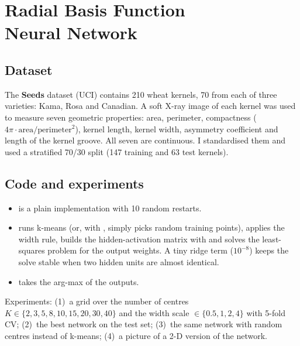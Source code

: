 \chapter[Radial Basis Function Neural Network]{Radial Basis Function\\Neural Network}


\section{Dataset}
The \textbf{Seeds} dataset (UCI) contains 210 wheat kernels, 70 from each of three varieties: Kama,
Rosa and Canadian. A soft X-ray image of each kernel was used to measure seven geometric properties:
area, perimeter, compactness ($4\pi\cdot\text{area}/\text{perimeter}^2$), kernel length, kernel width,
asymmetry coefficient and length of the kernel groove. All seven are continuous. I standardised them and
used a stratified 70/30 split (147 training and 63 test kernels).

\section{Code and experiments}
\begin{itemize}
\item {} is a plain implementation with 10 random restarts.
\item {} runs k-means (or, with , simply picks
      random training points), applies the width rule, builds the hidden-activation matrix with
       and solves the least-squares problem for the output weights. A tiny ridge term
      ($10^{-8}$) keeps the solve stable when two hidden units are almost identical.
\item {} takes the arg-max of the outputs.
\end{itemize}
\noindent Experiments: (1)~a grid over the number of centres $K\in\{2,3,5,8,10,15,20,30,40\}$ and the
width scale $\in\{0.5,1,2,4\}$ with 5-fold CV; (2)~the best network on the test set; (3)~the same
network with random centres instead of k-means; (4)~a picture of a 2-D version of the network.

